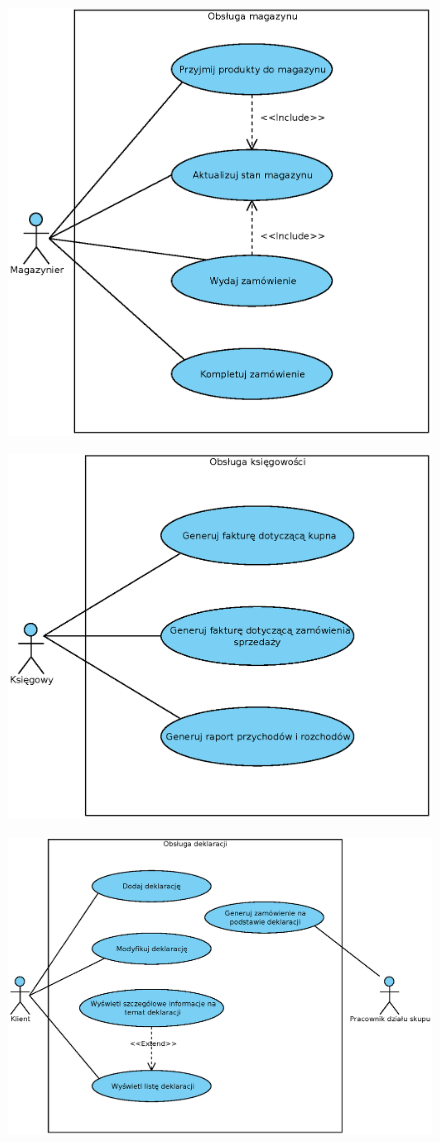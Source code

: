 
\begin{figure}[H]
	\centering
	\includegraphics[width=.8\textwidth]{img/UC/magazyn.eps}
\end{figure}

\begin{figure}[H]
	\centering
	\includegraphics[width=.8\textwidth]{img/UC/ksiegowosc.eps}
\end{figure}

\begin{figure}[H]
	\centering
	\includegraphics[width=1.1\textwidth]{img/UC/deklaracje.eps}
\end{figure}